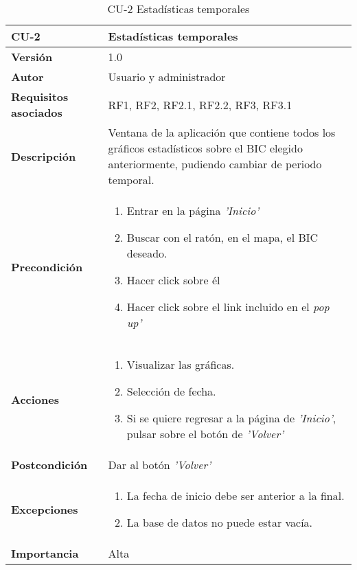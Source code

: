\begin{table}[h!]
	\centering
	\begin{tabularx}{\linewidth}{ p{} p{} }
		\toprule
		\textbf{CU-2}    & \textbf{Estadísticas temporales}\\
		\toprule
		\textbf{Versión}              & 1.0    \\
		\textbf{Autor}                & Usuario y administrador \\
		\textbf{Requisitos asociados} & RF1, RF2, RF2.1, RF2.2, RF3, RF3.1\\
		\textbf{Descripción}          & Ventana de la aplicación que contiene todos los gráficos estadísticos sobre el BIC elegido anteriormente, pudiendo cambiar de periodo temporal.  \\
        \textbf{Precondición}         & 
        \begin{enumerate}
			\def\labelenumi{\arabic{enumi}.}
			\tightlist
			\item Entrar en la página \textit{'Inicio'}
			\item Buscar con el ratón, en el mapa, el BIC deseado.
            \item Hacer click sobre él
            \item Hacer click sobre el link incluido en el \textit{pop up'} 
            
		\end{enumerate}\\
		
		\textbf{Acciones}             &
		\begin{enumerate}
			\def\labelenumi{\arabic{enumi}.}
			\tightlist
			\item Visualizar las gráficas.
                \item Selección de fecha.
            
            \item Si se quiere regresar a la página de \textit{'Inicio'}, pulsar sobre el botón de \textit{'Volver'}

		\end{enumerate}\\
		\textbf{Postcondición}        &  Dar al botón \textit{'Volver'}\\
		\textbf{Excepciones}  &
            \begin{enumerate}
                \item La fecha de inicio debe ser anterior a la final.
                \item La base de datos no puede estar vacía.
            \end{enumerate}  \\
            
		\textbf{Importancia}          & Alta \\
		\bottomrule
	\end{tabularx}
	\caption{CU-2 Estadísticas temporales}
\end{table}
